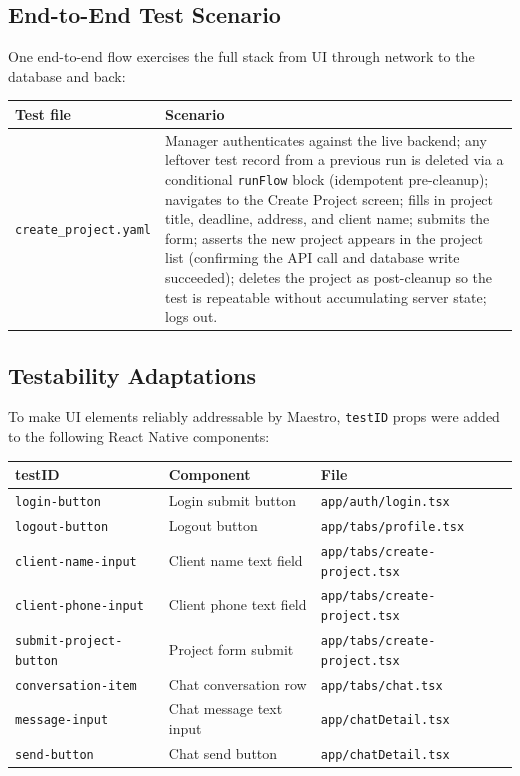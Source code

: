 \documentclass[12pt,a4paper]{article}
\begin{document}
\subsection{End-to-End Test Scenario}

One end-to-end flow exercises the full stack from UI through network to the database and back:

\begin{tabularx}{\textwidth}{|l|X|}
\hline
\textbf{Test file} & \textbf{Scenario} \\
\hline
\texttt{create\_project.yaml} &
  Manager authenticates against the live backend; any leftover test record from a previous run is deleted via a conditional \texttt{runFlow} block (idempotent pre-cleanup); navigates to the Create Project screen; fills in project title, deadline, address, and client name; submits the form; asserts the new project appears in the project list (confirming the API call and database write succeeded); deletes the project as post-cleanup so the test is repeatable without accumulating server state; logs out. \\
\hline
\end{tabularx}

\subsection{Testability Adaptations}

To make UI elements reliably addressable by Maestro, \texttt{testID} props were added to the following React Native components:

\begin{tabular}{lll}
\toprule
\textbf{testID} & \textbf{Component} & \textbf{File} \\
\midrule
\texttt{login-button}          & Login submit button     & \texttt{app/auth/login.tsx} \\
\texttt{logout-button}         & Logout button           & \texttt{app/tabs/profile.tsx} \\
\texttt{client-name-input}     & Client name text field  & \texttt{app/tabs/create-project.tsx} \\
\texttt{client-phone-input}    & Client phone text field & \texttt{app/tabs/create-project.tsx} \\
\texttt{submit-project-button} & Project form submit     & \texttt{app/tabs/create-project.tsx} \\
\texttt{conversation-item}     & Chat conversation row   & \texttt{app/tabs/chat.tsx} \\
\texttt{message-input}         & Chat message text input & \texttt{app/chatDetail.tsx} \\
\texttt{send-button}           & Chat send button        & \texttt{app/chatDetail.tsx} \\
\bottomrule
\end{tabular}
\end{document}
